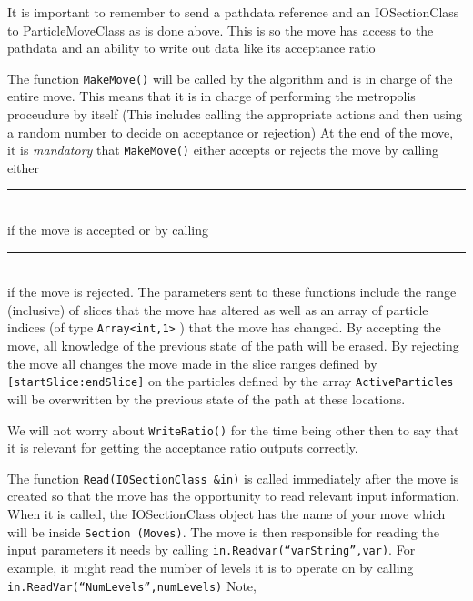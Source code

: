 \documentclass{book}
\begin{document}
It is important to remember to send a pathdata reference and an
  IOSectionClass to ParticleMoveClass as is done above. This is so the
  move has access to the pathdata and an ability to write out data
  like its acceptance ratio


The function \texttt{MakeMove()} will be called by the algorithm 
and is in charge of the entire move. This means that it is in charge
of performing the metropolis proceudure by itself (This includes calling
the appropriate actions and then using a random number to decide on 
acceptance or rejection)
At the end of the move, it is {\em mandatory} that \texttt{MakeMove()} 
either accepts or
rejects the move by calling either \\
\rule{0.6cm}{0cm}\\
if the move is accepted or by calling\\
\rule{0.6cm}{0cm}\\
 if the move is rejected.  
The parameters sent to these functions
include the range (inclusive) of slices that the move has altered as
well as an array of particle indices 
(of type  \texttt{Array<int,1>} ) that the move has changed.  
By accepting the move, all knowledge of the previous state of the path
will be erased. By rejecting the move all changes the move made in the
slice ranges defined by \texttt{[startSlice:endSlice]} on the particles defined
by the array \texttt{ActiveParticles} will be overwritten by the previous state
of the path at these locations.  


We will not worry about \texttt{WriteRatio()} for the time being other then to
say that it is relevant for getting the acceptance ratio outputs
correctly.

The function \texttt{Read(IOSectionClass \&in)} is called immediately after the
move is created so that the move has the opportunity to read relevant
input information.  When it is called, the IOSectionClass object
has the name of your move which
will be inside \texttt{Section (Moves)}.
 The move is then responsible for reading the input parameters it needs
by calling \texttt{in.Readvar(``varString'',var)}. For example, it might read the 
number of levels it is to operate on by calling 
\texttt{in.ReadVar(``NumLevels'',numLevels)} Note,
\end{document}
